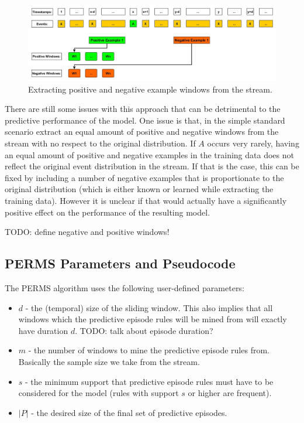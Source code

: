 \begin{figure}[h]
	\centering
  	\includegraphics[width=\textwidth]{trainingDataPositiveAndNegativeWindows}
	\caption{Extracting positive and negative example windows from the stream.}
	\label{fig_trainingDataNaive}
\end{figure}

There are still some issues with this approach that can be detrimental to the predictive performance of the model. One issue is that, in the simple standard scenario extract an equal amount of positive and negative windows from the stream with no respect to the original distribution. If $A$ occurs very rarely, having an equal amount of positive and negative examples in the training data does not reflect the original event distribution in the stream. If that is the case, this can be fixed by including a number of negative examples that is proportionate to the original distribution (which is either known or learned while extracting the training data). However it is unclear if that would actually have a significantly positive effect on the performance of the resulting model.



TODO: define negative and positive windows!




\subsection{PERMS Parameters and Pseudocode}

The PERMS algorithm uses the following user-defined parameters:

\begin{itemize}
	\item \textbf{$d$} - the (temporal) size of the sliding window. This also implies that all windows which the predictive episode rules will be mined from will exactly have duration $d$. TODO: talk about episode duration?	
	\item \textbf{$m$} - the number of windows to mine the predictive episode rules from. Basically the sample size we take from the stream.
	\item \textbf{$s$} - the minimum support that predictive episode rules must have to be considered for the model (rules with support $s$ or higher are frequent).
	\item \textbf{$|P|$} - the desired size of the final set of predictive episodes.
\end{itemize}


